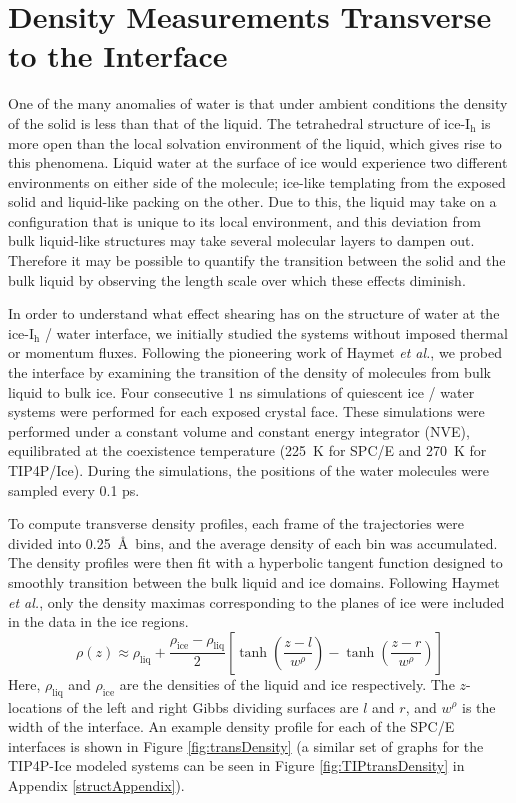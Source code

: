 \section{Density Measurements Transverse to the Interface}
One of the many anomalies of water is that under ambient conditions
the density of the solid is less than that of the liquid. The
tetrahedral structure of ice-I$_\mathrm{h}$ is more open than the
local solvation environment of the liquid, which gives rise to this
phenomena. Liquid water at the surface of ice would experience two
different environments on either side of the molecule; ice-like
templating from the exposed solid and liquid-like packing on the
other. Due to this, the liquid may take on a configuration that is
unique to its local environment, and this deviation from bulk
liquid-like structures may take several molecular layers to dampen
out. Therefore it may be possible to quantify the transition between
the solid and the bulk liquid by observing the length scale over which
these effects diminish.

In order to understand what effect shearing has on the structure of
water at the ice-I$_\mathrm{h}$ / water interface, we initially
studied the systems without imposed thermal or momentum
fluxes. Following the pioneering work of Haymet \textit{et al.}, we
probed the interface by examining the transition of the density of
molecules from bulk liquid to bulk
ice.\cite{Karim1987,Karim1990,Hayward2001,Bryk2004} Four consecutive 1
ns simulations of quiescent ice / water systems were performed for
each exposed crystal face. These simulations were performed under a
constant volume and constant energy integrator (NVE), equilibrated at
the coexistence temperature (225~K for SPC/E and 270~K for
TIP4P/Ice). During the simulations, the positions of the water
molecules were sampled every 0.1 ps.

To compute transverse density profiles, each frame of the trajectories
were divided into 0.25~\AA~bins, and the average density of each bin
was accumulated. The density profiles were then fit with a hyperbolic
tangent function designed to smoothly transition between the bulk
liquid and ice domains. Following Haymet \textit{et al.}, only the
density maximas corresponding to the planes of ice were included in
the data in the ice regions.
\begin{equation}\label{rho_fit}
\rho (z) \approx
\rho_\mathrm{liq}+\frac{\rho_\mathrm{ice}-\rho_\mathrm{liq}}{2}\left[\tanh\left(\frac{z-l}{w^\rho}\right)-\tanh\left(\frac{z-r}{w^\rho}\right)\right]
\end{equation}
Here, $\rho_\mathrm{liq}$ and $\rho_\mathrm{ice}$ are the densities of
the liquid and ice respectively. The $z$-locations of the left and
right Gibbs dividing surfaces are $l$ and $r$, and $w^\rho$ is the
width of the interface. An example density profile for each of the
SPC/E interfaces is shown in Figure \ref{fig:transDensity} (a similar
set of graphs for the TIP4P-Ice modeled systems can be seen in Figure
\ref{fig:TIPtransDensity} in Appendix \ref{structAppendix}).

